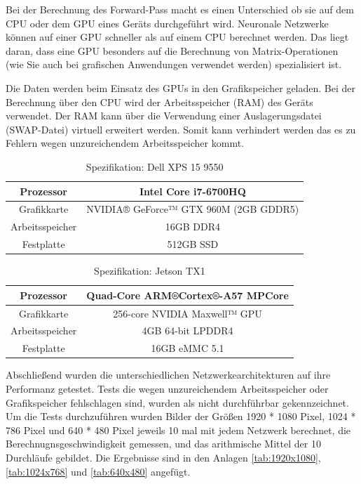 Bei der Berechnung des Forward-Pass macht es einen Unterschied ob sie  auf dem CPU oder dem GPU eines Geräts durchgeführt wird. Neuronale Netzwerke können auf einer GPU schneller als auf einem CPU berechnet werden. Das liegt daran, dass eine GPU besonders auf die Berechnung von Matrix-Operationen (wie Sie auch bei grafischen Anwendungen verwendet werden) spezialisiert ist.

Die Daten werden beim Einsatz des GPUs in den Grafikspeicher geladen. Bei der Berechnung über den CPU wird der Arbeitsspeicher (RAM) des Geräts verwendet. Der RAM kann über die Verwendung einer Auslagerungsdatei (SWAP-Datei) virtuell erweitert werden. Somit kann verhindert werden das es zu Fehlern wegen unzureichendem Arbeitsspeicher kommt.

\begin{table}[H]
    \centering
    \begin{tabular}{ |c|c| }
        \hline
        Prozessor       & Intel Core i7-6700HQ \\ \hline
        Grafikkarte     & NVIDIA® GeForce™ GTX 960M (2GB GDDR5) \\ \hline
        Arbeitsspeicher & 16GB DDR4  \\ \hline
        Festplatte      & 512GB SSD \\ \hline
    \end{tabular}
    \caption{Spezifikation: Dell XPS 15 9550}
    \label{tab:xps15}
\end{table}

\begin{table}[H]
    \centering
    \begin{tabular}{ |c|c| }
        \hline
        Prozessor       & Quad-Core ARM®Cortex®-A57 MPCore \\ \hline
        Grafikkarte     & 256-core NVIDIA Maxwell™ GPU \\ \hline
        Arbeitsspeicher & 4GB 64-bit LPDDR4  \\ \hline
        Festplatte      & 16GB eMMC 5.1 \\ \hline
    \end{tabular}
    \caption{Spezifikation: Jetson TX1}
    \label{tab:jetson_tx1}
\end{table}


Abschließend wurden die unterschiedlichen Netzwerkearchitekturen auf ihre Performanz getestet. Tests die wegen unzureichendem Arbeitsspeicher oder Grafikspeicher fehlschlagen sind, wurden als \textcolor{danger}{nicht durchführbar} gekennzeichnet. Um die Tests durchzuführen wurden Bilder der Größen 1920 * 1080 Pixel, 1024 * 786 Pixel und 640 * 480 Pixel jeweils 10 mal mit jedem Netzwerk berechnet, die Berechnugnsgeschwindigkeit gemessen, und das arithmische Mittel der 10 Durchläufe gebildet. Die Ergebnisse sind in den Anlagen \ref{tab:1920x1080}, \ref{tab:1024x768} und \ref{tab:640x480} angefügt.

